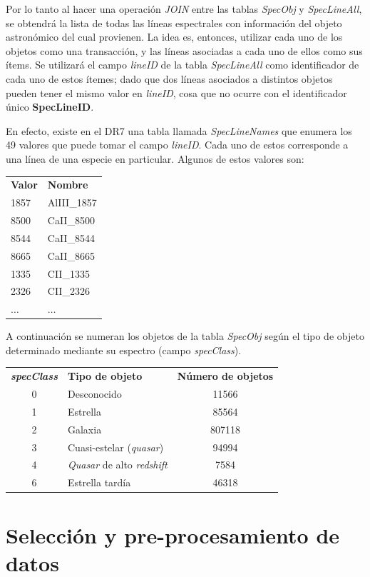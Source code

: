 Por lo tanto al hacer una operación \textit{JOIN} entre las tablas \textit{SpecObj} y \textit{SpecLineAll}, se obtendrá la lista de todas las líneas espectrales con información del objeto astronómico del cual provienen. La idea es, entonces, utilizar cada uno de los objetos como una transacción, y las líneas asociadas a cada uno de ellos como sus ítems. Se utilizará el campo \textit{lineID} de la tabla \textit{SpecLineAll} como identificador de cada uno de estos ítemes; dado que dos líneas asociados a distintos objetos pueden tener el mismo valor en \textit{lineID}, cosa que no ocurre con el identificador único \textbf{SpecLineID}. 

En efecto, existe en el DR7 una tabla llamada \textit{SpecLineNames} que enumera los 49 valores que puede tomar el campo \textit{lineID}. Cada uno de estos corresponde a una línea de una especie en particular. Algunos de estos valores son:

\begin{tabular}{l l}
\textbf{Valor} & \textbf{Nombre} \\
1857 & AlIII\_1857 \\
8500 & CaII\_8500 \\
8544 & CaII\_8544 \\
8665 & CaII\_8665 \\
1335 & CII\_1335 \\
2326 & CII\_2326 \\
$\ldots$ & $\ldots$ \\
\end{tabular}

A continuación se numeran los objetos de la tabla \textit{SpecObj} según el tipo de objeto determinado mediante su espectro (campo \textit{specClass}).

\begin{tabular}{c l c}
\textbf{\textit{specClass}} & \textbf{Tipo de objeto} & \textbf{Número de objetos}\\
0 & Desconocido & 11566 \\
1 & Estrella & 85564 \\
2 & Galaxia & 807118 \\
3 & Cuasi-estelar (\textit{quasar}) & 94994 \\
4 & \textit{Quasar} de alto \textit{redshift} & 7584 \\
6 & Estrella tardía & 46318 \\
\end{tabular}

\section{Selección y pre-procesamiento de datos}

